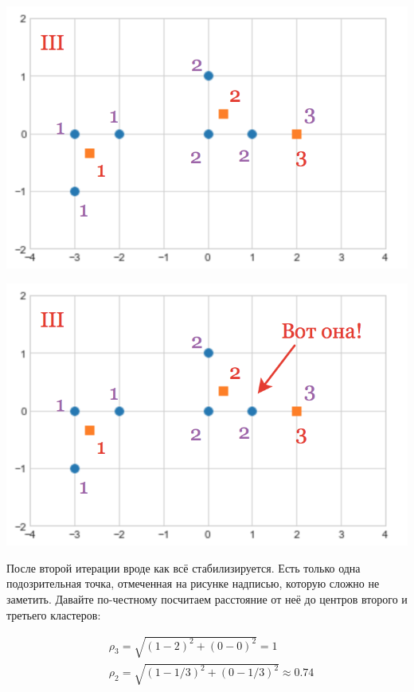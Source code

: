\documentclass[12pt, a4paper, oneside]{article}
\begin{document}
{\begin{enumerate}
\begin{minipage}[t]{0.45\textwidth}
	\includegraphics[scale=0.25]{k_means_b3.png}
\end{minipage}
\hfill
\begin{minipage}[t]{0.45\textwidth}
	\includegraphics[scale=0.25]{k_means_b4.png}
\end{minipage}

После второй итерации вроде как всё стабилизируется. Есть только одна подозрительная точка, отмеченная на рисунке надписью, которую сложно не заметить. Давайте по-честному посчитаем расстояние от неё до  центров второго и третьего кластеров: 

\begin{equation}
\begin{aligned}
& \rho_3 = \sqrt{(1 - 2)^2 + (0 - 0)^2} = 1 \\ 
& \rho_2 = \sqrt{(1 - 1/3)^2 + (0 - 1/3)^2} \approx 0.74 \\ 
\end{aligned}
\end{equation}


\end{enumerate}}
\end{document}
